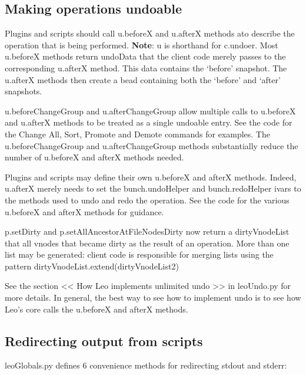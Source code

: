 \documentclass[a4paper,10pt,english]{sphinxmanual}
\begin{document}
\subsection{Making operations undoable}
\label{scripting:making-operations-undoable}
Plugins and scripts should call u.beforeX and u.afterX methods ato
describe the operation that is being performed. \textbf{Note}: u is shorthand for
c.undoer. Most u.beforeX methods return undoData that the client
code merely passes to the corresponding u.afterX method. This data contains
the `before' snapshot. The u.afterX methods then create a bead containing
both the `before' and `after' snapshots.

u.beforeChangeGroup and u.afterChangeGroup allow multiple calls to
u.beforeX and u.afterX methods to be treated as a single undoable entry.
See the code for the Change All, Sort, Promote and Demote
commands for examples. The u.beforeChangeGroup and u.afterChangeGroup
methods substantially reduce the number of u.beforeX and afterX methods
needed.

Plugins and scripts may define their own u.beforeX and afterX methods. Indeed,
u.afterX merely needs to set the bunch.undoHelper and
bunch.redoHelper ivars to the methods used to undo and redo the operation.
See the code for the various u.beforeX and afterX methods for guidance.

p.setDirty and p.setAllAncestorAtFileNodesDirty now return a
dirtyVnodeList that all vnodes that became dirty as the result of an
operation. More than one list may be generated: client code is responsible for
merging lists using the pattern dirtyVnodeList.extend(dirtyVnodeList2)

See the section \textless{}\textless{} How Leo implements unlimited undo \textgreater{}\textgreater{} in leoUndo.py
for more details. In general, the best way to see how to implement undo is to
see how Leo's core calls the u.beforeX and afterX methods.


\subsection{Redirecting output from scripts}
\label{scripting:redirecting-output-from-scripts}
leoGlobals.py defines 6 convenience methods for redirecting stdout and stderr:
\end{document}
